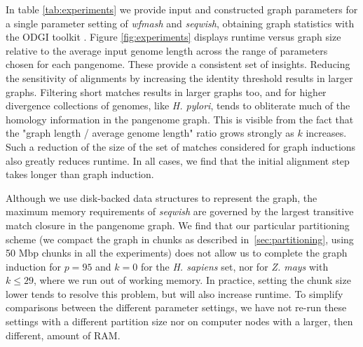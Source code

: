 \documentclass{bioinfo}
\theoremstyle{definition}
\begin{document}

In table \ref{tab:experiments} we provide input and constructed graph parameters for a single parameter setting of \textit{wfmash} and \textit{seqwish}, obtaining graph statistics with the ODGI toolkit \citep{Guarracino2022}.
Figure \ref{fig:experiments} displays runtime versus graph size relative to the average input genome length across the range of parameters chosen for each pangenome.
These provide a consistent set of insights.
Reducing the sensitivity of alignments by increasing the identity threshold results in larger graphs.
Filtering short matches results in larger graphs too, and for higher divergence collections of genomes, like \textit{H. pylori}, tends to obliterate much of the homology information in the pangenome graph.
This is visible from the fact that the "graph length / average genome length" ratio grows strongly as $k$ increases.
Such a reduction of the size of the set of matches considered for graph inductions also greatly reduces runtime.
In all cases, we find that the initial alignment step takes longer than graph induction.


Although we use disk-backed data structures to represent the graph, the maximum memory requirements of \textit{seqwish} are governed by the largest transitive match closure in the pangenome graph.
We find that our particular partitioning scheme (we compact the graph in chunks as described in~\ref{sec:partitioning}, using 50 Mbp chunks in all the experiments) does not allow us to complete the graph induction for $p=95$ and $k=0$ for the \textit{H. sapiens} set, nor for \textit{Z. mays} with $k \leq 29$, where we run out of working memory.
In practice, setting the chunk size lower tends to resolve this problem, but will also increase runtime.
To simplify comparisons between the different parameter settings, we have not re-run these settings with a different partition size nor on computer nodes with a larger, then different, amount of RAM.
\end{document}

